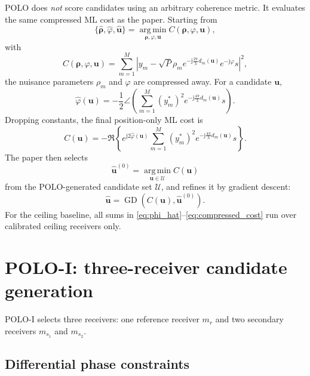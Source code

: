 \documentclass[11pt]{article}
\newcommand{\jj}{\mathrm{j}}
\newcommand{\argmin}{\operatorname*{arg\,min}}
\newcommand{\GD}{\operatorname{GD}}
\begin{document}
POLO does \emph{not} score candidates using an arbitrary coherence metric. It evaluates the same compressed ML cost as the paper. Starting from
\begin{equation}
    \{\hat{\bm\rho},\hat\varphi,\hat{\mathbf{u}}\}
    =\argmin_{\bm\rho,\varphi,\mathbf{u}} C(\bm\rho,\varphi,\mathbf{u}),
\end{equation}
with
\begin{equation}
    C(\bm\rho,\varphi,\mathbf{u})
    =\sum_{m=1}^{M}\left|
    y_m-\sqrt{P}\rho_m e^{-\jj\frac{2\pi}{\lambda}d_m(\mathbf{u})}e^{-\jj\varphi}s
    \right|^2,
    \label{eq:full_cost}
\end{equation}
the nuisance parameters $\rho_m$ and $\varphi$ are compressed away. For a candidate $\mathbf{u}$,
\begin{equation}
    \hat\varphi(\mathbf{u})
    =-\frac{1}{2}\angle\left(
    \sum_{m=1}^{M}(y_m^*)^2
    e^{-\jj\frac{4\pi}{\lambda}d_m(\mathbf{u})}s
    \right).
    \label{eq:phi_hat}
\end{equation}
Dropping constants, the final position-only ML cost is
\begin{equation}
    C(\mathbf{u})
    =-\Re\left\{
    e^{\jj 2\hat\varphi(\mathbf{u})}
    \sum_{m=1}^{M}(y_m^*)^2
    e^{-\jj\frac{4\pi}{\lambda}d_m(\mathbf{u})}s
    \right\}.
    \label{eq:compressed_cost}
\end{equation}
The paper then selects
\begin{equation}
    \hat{\mathbf{u}}^{(0)} = \argmin_{\mathbf{u}\in\mathcal{U}} C(\mathbf{u})
    \label{eq:candidate_ml_selection}
\end{equation}
from the POLO-generated candidate set $\mathcal{U}$, and refines it by gradient descent:
\begin{equation}
    \hat{\mathbf{u}}=\GD\left(C(\mathbf{u}),\hat{\mathbf{u}}^{(0)}\right).
    \label{eq:gd_refinement}
\end{equation}
For the ceiling baseline, all sums in \eqref{eq:phi_hat}--\eqref{eq:compressed_cost} run over calibrated ceiling receivers only.

\section{POLO-I: three-receiver candidate generation}
\label{sec:polo_i}

POLO-I selects three receivers: one reference receiver $m_r$ and two secondary receivers $m_{s_1}$ and $m_{s_2}$.

\subsection{Differential phase constraints}
\end{document}
